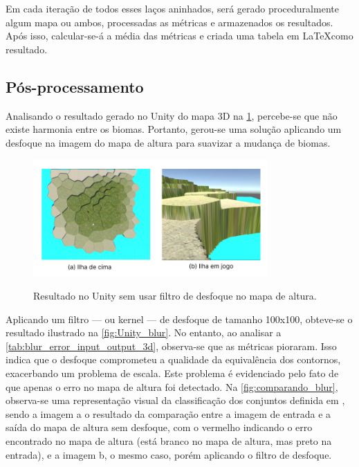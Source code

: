 Em cada iteração de todos esses laços aninhados, será gerado proceduralmente algum mapa ou ambos, processadas as métricas e armazenados os resultados. Após isso, calcular-se-á a média das métricas e criada uma tabela em \LaTeX como resultado.

\subsection{Pós-processamento}
Analisando o resultado gerado no Unity do mapa 3D na \cref{fig:Unity_init}, percebe-se que não existe harmonia entre os biomas. Portanto, gerou-se uma solução aplicando um desfoque na imagem do mapa de altura para suavizar a mudança de biomas.

\begin{figure}[!ht]
	\centering
    \caption{Resultado no Unity sem usar filtro de desfoque no mapa de altura.}
	\includegraphics[width=0.8\textwidth]{figures/Unity_entry.png}
	\label{fig:Unity_init}
\end{figure}

Aplicando um filtro — ou kernel — de desfoque de tamanho 100x100, obteve-se o resultado ilustrado na \cref{fig:Unity_blur}. No entanto, ao analisar a \cref{tab:blur_error_input_output_3d}, observa-se que as métricas pioraram. Isso indica que o desfoque comprometeu a qualidade da equivalência dos contornos, exacerbando um problema de escala. Este problema é evidenciado pelo fato de que apenas o erro no mapa de altura foi detectado. Na \cref{fig:comparando_blur}, observa-se uma representação visual da classificação dos conjuntos definida em , sendo a imagem a o resultado da comparação entre a imagem de entrada e a saída do mapa de altura sem desfoque, com o vermelho indicando o erro encontrado no mapa de altura (está branco no mapa de altura, mas preto na entrada), e a imagem b, o mesmo caso, porém aplicando o filtro de desfoque.

